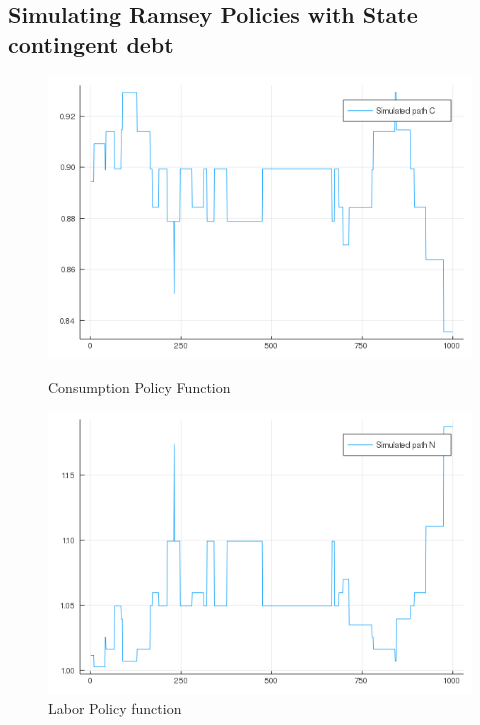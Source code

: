 \documentclass[12pt]{article}
\begin{document}
\subsection*{Simulating Ramsey Policies with State contingent debt}
\begin{figure}[h]
    \centering
    \begin{minipage}{0.45\textwidth}
        \centering
        \includegraphics[width=1.2\textwidth]{ramsey_C.png} %
        \caption{Consumption Policy Function}
    \end{minipage}\hfill
    \begin{minipage}{0.45\textwidth}
        \centering
        \includegraphics[width=1.2\textwidth]{ramsey_N.png} %
        \caption{Labor Policy function}
    \end{minipage}
\end{figure}
\end{document}
